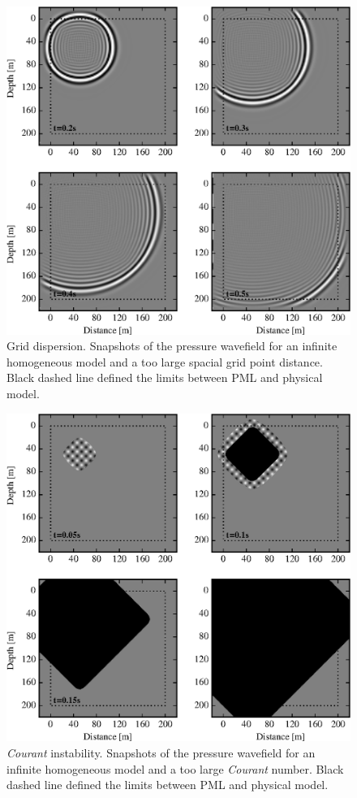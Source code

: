 \documentclass{gnulike}
\begin{document}
\clearpage\newpage
\begin{figure}[!ht]
  \centering
  \includegraphics[width=0.9\columnwidth]{fig/validation_snap_dispersion.eps}
  \caption{Grid dispersion. Snapshots of the pressure wavefield for an infinite homogeneous model and a too large spacial grid point distance. Black dashed line defined the limits between PML and physical model.}
  \label{fig:dispersion-validation}
\end{figure}

\begin{figure}[!ht]
  \centering
  \includegraphics[width=0.9\columnwidth]{fig/validation_courant.eps}
  \caption{\textit{Courant} instability. Snapshots of the pressure wavefield for an infinite homogeneous model and a too large \textit{Courant} number. Black dashed line defined the limits between PML and physical model.}
  \label{fig:courant-validation}
\end{figure}
\end{document}
